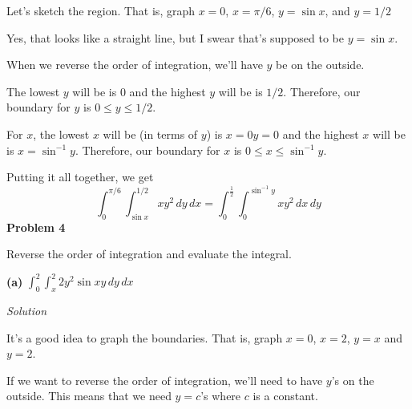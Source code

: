 \documentclass{article}
\newcommand{\Solution}{\textit{Solution}}
\begin{document}
Let's sketch the region. That is, graph $x=0$, $x=\pi/6$, $y=\sin x$, and $y=1/2$
\begin{center}
\end{center}
Yes, that looks like a straight line, but I swear that's supposed to be $y=\sin x$.

When we reverse the order of integration, we'll have $y$ be on the outside.

The lowest $y$ will be is $0$ and the highest $y$ will be is $1/2$. Therefore, our boundary for $y$ is $0\leq y\leq 1/2$.

For $x$, the lowest $x$ will be (in terms of $y$) is $x=0y=0$ and the highest $x$ will be is $x=\sin^{-1} y$. Therefore, our boundary for $x$ is $0\leq x \leq \sin^{-1} y$.

Putting it all together, we get
\begin{equation*}
    \boxed{\int_0^{\pi / 6}\int_{\sin x}^{1/2}xy^2\,dy\,dx=\int_0^{\frac{1}{2}}\int_0^{\sin^{-1}y}xy^2\,dx\,dy}
\end{equation*}
\textbf{Problem 4}

Reverse the order of integration and evaluate the integral.

\textbf{(a)} $\displaystyle \int_0^2\int_x^2 2y^2\sin xy\,dy\,dx$

\Solution

It's a good idea to graph the boundaries. That is, graph $x=0$, $x=2$, $y=x$ and $y=2$.

\begin{center}
\end{center}
If we want to reverse the order of integration, we'll need to have $y$'s on the outside. This means that we need $y=c$'s where $c$ is a constant.
\end{document}
